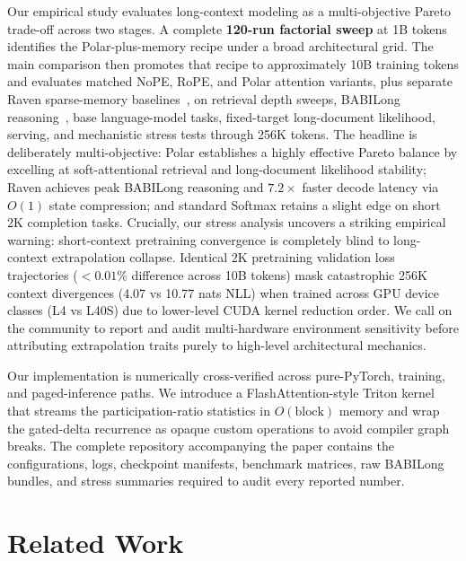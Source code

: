 \documentclass{article} %
\begin{document}
Our empirical study evaluates long-context modeling as a multi-objective Pareto trade-off across two stages. A complete \textbf{120-run factorial sweep} at 1B tokens identifies the Polar-plus-memory recipe under a broad architectural grid. The main comparison then promotes that recipe to approximately 10B training tokens and evaluates matched NoPE, RoPE, and Polar attention variants, plus separate Raven sparse-memory baselines~\citep{raven2026}, on retrieval depth sweeps, BABILong reasoning~\citep{babilong2024}, base language-model tasks, fixed-target long-document likelihood, serving, and mechanistic stress tests through 256K tokens. The headline is deliberately multi-objective: Polar establishes a highly effective Pareto balance by excelling at soft-attentional retrieval and long-document likelihood stability; Raven achieves peak BABILong reasoning and $7.2\times$ faster decode latency via $O(1)$ state compression; and standard Softmax retains a slight edge on short 2K completion tasks. Crucially, our stress analysis uncovers a striking empirical warning: short-context pretraining convergence is completely blind to long-context extrapolation collapse. Identical 2K pretraining validation loss trajectories ($<0.01\%$ difference across 10B tokens) mask catastrophic 256K context divergences (4.07 vs 10.77 nats NLL) when trained across GPU device classes (L4 vs L40S) due to lower-level CUDA kernel reduction order. We call on the community to report and audit multi-hardware environment sensitivity before attributing extrapolation traits purely to high-level architectural mechanics.

Our implementation is numerically cross-verified across pure-PyTorch, training, and paged-inference paths. We introduce a FlashAttention-style Triton kernel that streams the participation-ratio statistics in $O(\text{block})$ memory and wrap the gated-delta recurrence as opaque custom operations to avoid compiler graph breaks. The complete repository accompanying the paper contains the configurations, logs, checkpoint manifests, benchmark matrices, raw BABILong bundles, and stress summaries required to audit every reported number.

\section{Related Work}
\end{document}
